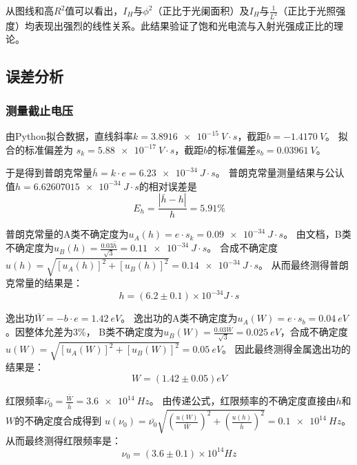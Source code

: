 \documentclass{../../templates/Report}%
\begin{document}
\begin{fullreportonly}
从图线和高$R^2$值可以看出，$I_H$与$\phi^2$（正比于光阑面积）及$I_H$与$\frac{1}{L^2}$（正比于光照强度）均表现出强烈的线性关系。此结果验证了饱和光电流与入射光强成正比的理论。

\subsection{误差分析}
\subsubsection{测量截止电压}
由Python拟合数据，直线斜率$k = \SI{3.8916e-15}{V\cdot s}$，截距$b = \SI{-1.4170}{V}$。
拟合的标准偏差为 $s_k = \SI{5.88e-17}{V\cdot s}$，截距$b$的标准偏差$s_b = \SI{0.03961}{V}$。

于是得到普朗克常量$\bar{h} = k\cdot e = \SI{6.23e-34}{J\cdot s}$。
普朗克常量测量结果与公认值$h = \SI{6.62607015e-34}{J\cdot s}$的相对误差是
\[E_h = \frac{|\bar{h}-h|}{h} = 5.91\%\]

普朗克常量的A类不确定度为$u_A(h) = e\cdot s_k = \SI{0.09e-34}{J\cdot s}$。
由文档，B类不确定度为$u_B(h) = \frac{0.03\bar{h}}{\sqrt{3}} = \SI{0.11e-34}{J\cdot s}$。
合成不确定度$u(h) = \sqrt{[u_A(h)]^2 + [u_B(h)]^2} = \SI{0.14e-34}{J\cdot s}$。
从而最终测得普朗克常量的结果是：
\[h = (6.2 \pm 0.1)\times 10^{-34} \si{J\cdot s}\]

逸出功$\bar{W} = -b\cdot e = \SI{1.42}{eV}$。
逸出功的A类不确定度为$u_A(W) = e\cdot s_b = \SI{0.04}{eV}$。因整体允差为$3\%$，
B类不确定度为$u_B(W) = \frac{0.03\bar{W}}{\sqrt{3}} = \SI{0.025}{eV}$，合成不确定度$u(W) = \sqrt{[u_A(W)]^2 +[u_B(W)]^2} = \SI{0.05}{eV}$。
因此最终测得金属逸出功的结果是：
\[W = (1.42 \pm 0.05) \si{eV}\]

红限频率$\bar{\nu_0} = \frac{\bar{W}}{\bar{h}} = \SI{3.6e14}{Hz}$。
由传递公式，红限频率的不确定度直接由$h$和$W$的不确定度合成得到
$u(\nu_0) = \bar{\nu_0} \sqrt{\left(\frac{u(W)}{\bar{W}}\right)^2 + \left(\frac{u(h)}{\bar{h}}\right)^2} = \SI{0.1e14}{Hz}$。
从而最终测得红限频率是：
\[\nu_0 = (3.6 \pm 0.1) \times 10^{14} \si{Hz}\]


\end{fullreportonly}
\end{document}
